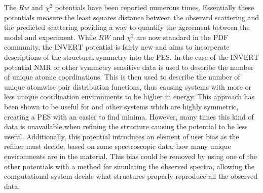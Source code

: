 The $Rw$ and $\chi^{2}$ potentials have been reported numerous times. \cite{Petkov2014, Masadeh2007, Choi2013, McGreevy, Proffen1997}
Essentially these potentials measure the least squares distance between the observed scattering and the predicted scattering poviding a way to quantify the agreement between the model and experiment.
While $RW$ and $\chi^{2}$ are now standard in the PDF community, the $\mathrm{INVERT}$ potential is fairly new and aims to incorperate descriptions of the structural symmetry into the PES. \cite{Cliffe2010, Cliffe2013}
In the case of the $\mathrm{INVERT}$ potential NMR or other symmetry sensitive data is used to describe the number of unique atomic coordinations.
This is then used to describe the number of unique atomwise pair distribution functions, thus causing systems with more or less unique coordination environments to be higher in energy.
This approach has been shown to be useful for  and other systems which are highly symmetric, creating a PES with an easier to find minima. \cite{Cliffe2010, Cliffe2013}
However, many times this kind of data is unavailable when refining the structure causing the potential to be less useful.
Additionally, this potential introduces an element of user bias as the refiner must decide, based on some spectroscopic data, how many unique environments are in the material.
This bias could be removed by using one of the other potentials with a method for simulating the observed spectra, allowing the computational system decide what structures properly reproduce all the observed data.

